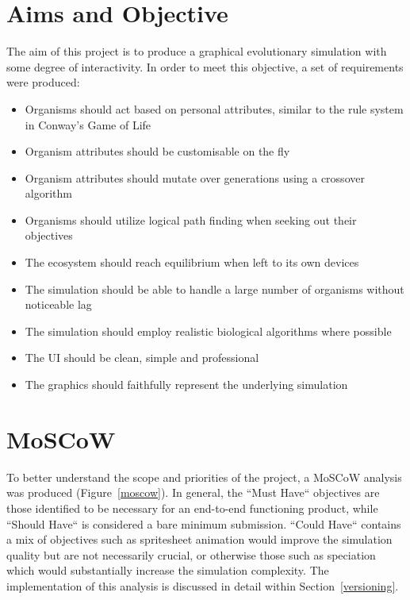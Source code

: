 \documentclass[a4paper, oneside, 11pt]{report}
\begin{document}
\section{Aims and Objective}
The aim of this project is to produce a graphical evolutionary simulation with some degree of interactivity. In order to meet this objective, a set of requirements were produced:
\begin{itemize}\label{requirements}
	\item Organisms should act based on personal attributes, similar to the rule system in Conway's Game of Life
	\item Organism attributes should be customisable on the fly
	\item Organism attributes should mutate over generations using a crossover algorithm
	\item Organisms should utilize logical path finding when seeking out their objectives
	\item The ecosystem should reach equilibrium when left to its own devices
	\item The simulation should be able to handle a large number of organisms without noticeable lag
	\item The simulation should employ realistic biological algorithms where possible
	\item The UI should be clean, simple and professional
	\item The graphics should faithfully represent the underlying simulation
\end{itemize}

\section{MoSCoW}
To better understand the scope and priorities of the project, a MoSCoW analysis was produced (Figure~\ref{moscow}). In general, the ``Must Have`` objectives are those identified to be necessary for an end-to-end functioning product, while ``Should Have`` is considered a bare minimum submission. ``Could Have`` contains a mix of objectives such as spritesheet animation would improve the simulation quality but are not necessarily crucial, or otherwise those such as speciation which would substantially increase the simulation complexity. The implementation of this analysis is discussed in detail within Section~\ref{versioning}.
\smallskip 
\end{document}
